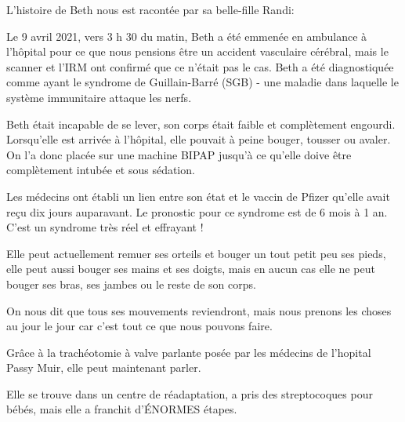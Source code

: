 L'histoire de Beth nous est racontée par sa belle-fille Randi:

Le 9 avril 2021, vers 3 h 30 du matin, Beth a été emmenée en ambulance à
l'hôpital pour ce que nous pensions être un accident vasculaire cérébral, mais
le scanner et l'IRM ont confirmé que ce n'était pas le cas. Beth a été
diagnostiquée comme ayant le syndrome de Guillain-Barré (SGB) - une maladie dans
laquelle le système immunitaire attaque les nerfs.

Beth était incapable de se lever, son corps était faible et complètement
engourdi. Lorsqu'elle est arrivée à l'hôpital, elle pouvait à peine bouger,
tousser ou avaler. On l'a donc placée sur une machine BIPAP jusqu'à ce qu'elle
doive être complètement intubée et sous sédation.

Les médecins ont établi un lien entre son état et le vaccin de Pfizer qu'elle
avait reçu dix jours auparavant. Le pronostic pour ce syndrome est de 6 mois à 1
an. C'est un syndrome très réel et effrayant !

Elle peut actuellement remuer ses orteils et bouger un tout petit peu ses pieds,
elle peut aussi bouger ses mains et ses doigts, mais en aucun cas elle ne peut
bouger ses bras, ses jambes ou le reste de son corps.

On nous dit que tous ses mouvements reviendront, mais nous prenons les choses au
jour le jour car c'est tout ce que nous pouvons faire.

Grâce à la trachéotomie à valve parlante posée par les médecins de l'hopital
Passy Muir, elle peut maintenant parler.

Elle se trouve dans un centre de réadaptation, a pris des streptocoques pour
bébés, mais elle a franchit d'ÉNORMES étapes.

